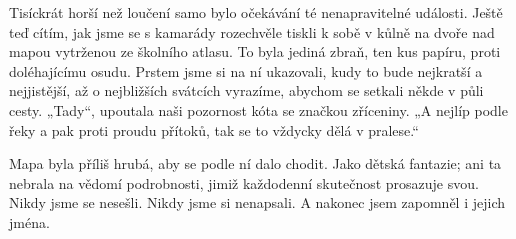Tisíckrát horší než loučení samo bylo očekávání té nenapravitelné události. Ještě teď cítím, jak jsme se s kamarády rozechvěle tiskli k sobě v kůlně na dvoře nad mapou vytrženou ze školního atlasu. To byla jediná zbraň, ten kus papíru, proti doléhajícímu osudu. Prstem jsme si na ní ukazovali, kudy to bude nejkratší a nejjistější, až o nejbližších svátcích vyrazíme, abychom se setkali někde v půli cesty. „Tady“, upoutala naši pozornost kóta se značkou zříceniny. „A nejlíp podle řeky a pak proti proudu přítoků, tak se to vždycky dělá v pralese.“ 

Mapa byla příliš hrubá, aby se podle ní dalo chodit. Jako dětská fantazie; ani ta nebrala na vědomí podrobnosti, jimiž každodenní skutečnost prosazuje svou. Nikdy jsme se nesešli. Nikdy jsme si nenapsali. A nakonec jsem zapomněl i jejich jména. 

